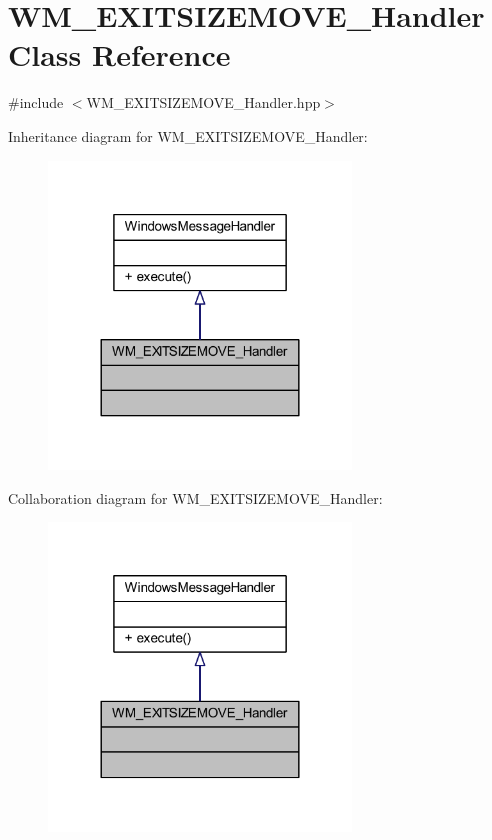 \hypertarget{class_w_m___e_x_i_t_s_i_z_e_m_o_v_e___handler}{}\section{W\+M\+\_\+\+E\+X\+I\+T\+S\+I\+Z\+E\+M\+O\+V\+E\+\_\+\+Handler Class Reference}
\label{class_w_m___e_x_i_t_s_i_z_e_m_o_v_e___handler}


{\ttfamily \#include $<$W\+M\+\_\+\+E\+X\+I\+T\+S\+I\+Z\+E\+M\+O\+V\+E\+\_\+\+Handler.\+hpp$>$}



Inheritance diagram for W\+M\+\_\+\+E\+X\+I\+T\+S\+I\+Z\+E\+M\+O\+V\+E\+\_\+\+Handler\+:\nopagebreak
\begin{figure}[H]
\begin{center}
\leavevmode
\includegraphics[width=228pt]{class_w_m___e_x_i_t_s_i_z_e_m_o_v_e___handler__inherit__graph}
\end{center}
\end{figure}


Collaboration diagram for W\+M\+\_\+\+E\+X\+I\+T\+S\+I\+Z\+E\+M\+O\+V\+E\+\_\+\+Handler\+:\nopagebreak
\begin{figure}[H]
\begin{center}
\leavevmode
\includegraphics[width=228pt]{class_w_m___e_x_i_t_s_i_z_e_m_o_v_e___handler__coll__graph}
\end{center}
\end{figure}
